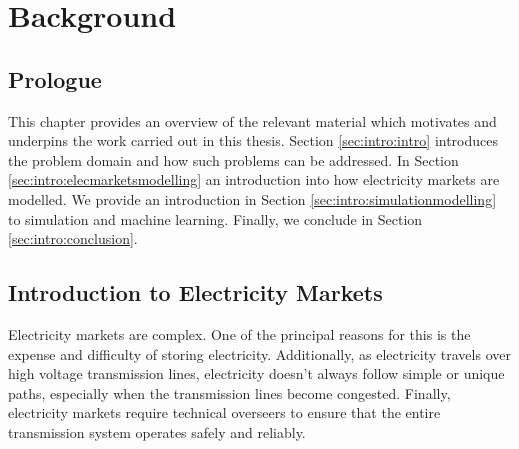 
\chapter{Background}
\label{chapter:background}
\ifpdf
    \graphicspath{{Chapter2/Figs/Raster/}{Chapter2/Figs/PDF/}{Chapter2/Figs/}}
\else
    \graphicspath{{Chapter2/Figs/Vector/}{Chapter2/Figs/}}
\fi


\section*{Prologue}

This chapter provides an overview of the relevant material which motivates and underpins the work carried out in this thesis. Section \ref{sec:intro:intro} introduces the problem domain and how such problems can be addressed. In Section \ref{sec:intro:elecmarketsmodelling} an introduction into how electricity markets are modelled. We provide an introduction in Section \ref{sec:intro:simulationmodelling} to simulation and machine learning. Finally, we conclude in Section \ref{sec:intro:conclusion}.


%

\section{Introduction to Electricity Markets}
\label{sec:intro:elecmarkets}

Electricity markets are complex. One of the principal reasons for this is the expense and difficulty of storing electricity. Additionally, as electricity travels over high voltage transmission lines, electricity doesn't always follow simple or unique paths, especially when the transmission lines become congested. Finally, electricity markets require technical overseers to ensure that the entire transmission system operates safely and reliably. 

